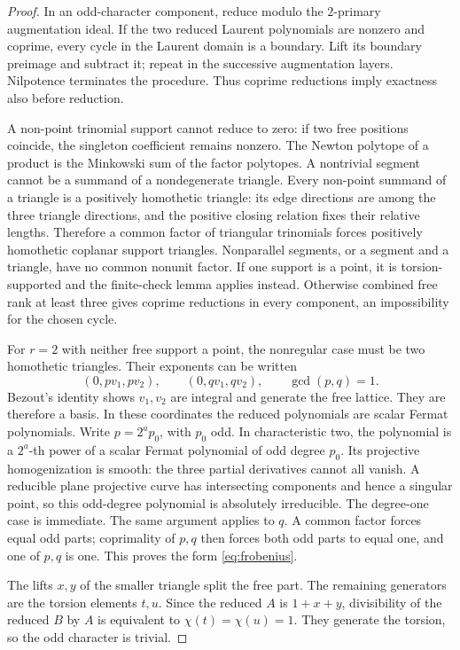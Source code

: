 \begin{proof}
In an odd-character component, reduce modulo the $2$-primary augmentation ideal. If the two reduced Laurent polynomials are nonzero and coprime, every cycle in the Laurent domain is a boundary. Lift its boundary preimage and subtract it; repeat in the successive augmentation layers. Nilpotence terminates the procedure. Thus coprime reductions imply exactness also before reduction.

A non-point trinomial support cannot reduce to zero: if two free positions coincide, the singleton coefficient remains nonzero. The Newton polytope of a product is the Minkowski sum of the factor polytopes. A nontrivial segment cannot be a summand of a nondegenerate triangle. Every non-point summand of a triangle is a positively homothetic triangle: its edge directions are among the three triangle directions, and the positive closing relation fixes their relative lengths. Therefore a common factor of triangular trinomials forces positively homothetic coplanar support triangles. Nonparallel segments, or a segment and a triangle, have no common nonunit factor. If one support is a point, it is torsion-supported and the finite-check lemma applies instead. Otherwise combined free rank at least three gives coprime reductions in every component, an impossibility for the chosen cycle.

For $r=2$ with neither free support a point, the nonregular case must be two homothetic triangles. Their exponents can be written
\[
 (0,pv_1,pv_2),\qquad (0,qv_1,qv_2),\qquad \gcd(p,q)=1.
\]
Bezout's identity shows $v_1,v_2$ are integral and generate the free lattice. They are therefore a basis. In these coordinates the reduced polynomials are scalar Fermat polynomials. Write $p=2^a p_0$, with $p_0$ odd. In characteristic two, the polynomial is a $2^a$-th power of a scalar Fermat polynomial of odd degree $p_0$. Its projective homogenization is smooth: the three partial derivatives cannot all vanish. A reducible plane projective curve has intersecting components and hence a singular point, so this odd-degree polynomial is absolutely irreducible. The degree-one case is immediate. The same argument applies to $q$. A common factor forces equal odd parts; coprimality of $p,q$ then forces both odd parts to equal one, and one of $p,q$ is one. This proves the form \eqref{eq:frobenius}.

The lifts $x,y$ of the smaller triangle split the free part. The remaining generators are the torsion elements $t,u$. Since the reduced $A$ is $1+x+y$, divisibility of the reduced $B$ by $A$ is equivalent to $\chi(t)=\chi(u)=1$. They generate the torsion, so the odd character is trivial.


\end{proof}
